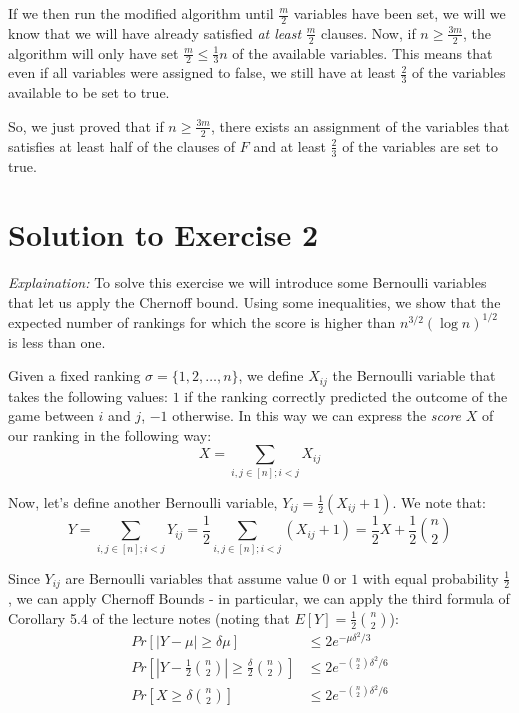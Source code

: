 \documentclass[a4paper,german]{article}
\begin{document}
If we then run the modified algorithm until $\frac{m}{2}$ variables have been set, we will we know that we will have already satisfied \emph{at least} $\frac{m}{2}$ clauses. Now, if $n \geq \frac{3m}{2}$, 
the algorithm will only have set $\frac{m}{2} \leq \frac{1}{3}n$ of the available variables. This means that 
even if all variables were assigned to false, we still have at least $\frac{2}{3}$ of the variables available to be set to true.

So, we just proved that if $n \geq \frac{3m}{2}$, there exists an assignment of the variables 
that satisfies at least half of the clauses of $F$ and at least $\frac{2}{3}$ of the variables
are set to true.











\section*{Solution to Exercise 2}

\emph{Explaination:} To solve this exercise we will introduce some Bernoulli variables that let us apply the Chernoff bound. Using some inequalities, we show that the expected number of rankings for which the score is higher than $n^{3/2} (\log n)^{1/2}$ is less than one.

\vspace{1em}

Given a fixed ranking $\sigma = \{1,2,\dots, n\}$, we define $X_{ij}$ the
Bernoulli variable that takes the following values: $1$ if the ranking
correctly predicted the outcome of the game between $i$ and $j$, $-1$
otherwise. 
In this way we can express the \emph{score} $X$ of our ranking in the following way:
$$ X = \sum_{i,j \in [n]; i<j} X_{ij} $$

Now, let's define another Bernoulli variable, $Y_{ij} = \frac{1}{2}(X_{ij} + 1)$. 
We note that:
$$ Y = \sum_{i,j \in [n]; i<j} Y_{ij} = \frac{1}{2} \sum_{i,j \in [n]; i<j} \left( X_{ij} + 1 \right) = 
\frac{1}{2} X  + \frac{1}{2} { n \choose 2 } $$

Since $Y_{ij}$ are Bernoulli variables that assume value $0$ or $1$ with equal probability $\frac{1}{2}$, we can apply Chernoff Bounds - in particular, we can apply the third formula of Corollary 5.4 of the lecture notes (noting that $E[Y] = \frac{1}{2}{n \choose 2}$):
\begin{equation}
\begin{aligned} 
	Pr [ | Y - \mu | \geq \delta \mu ] &\leq 2 e^{-\mu\delta^2 / 3}  \\
	Pr [ | Y - \frac{1}{2}{n \choose 2} | \geq \frac{\delta }{2} {n \choose 2} ] &\leq 2 e^{-{n \choose 2}\delta^2 / 6}  \\
	Pr [ X \geq \delta {n \choose 2} ] &\leq 2 e^{-{n \choose 2}\delta^2 / 6}  \\
\end{aligned}
\end{equation}
\end{document}
